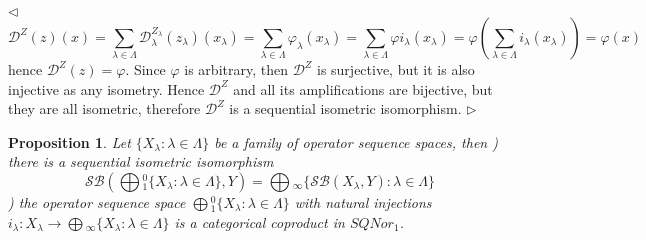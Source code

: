 \documentclass[12pt]{article}
\newtheorem{proposition}[theorem]{Proposition}
\newenvironment{proof}{\par $\triangleleft$}{$\triangleright$}
\begin{document}
\begin{proof}
$$
\mathcal{D}^{Z}(z)(x)
=\sum_{\lambda\in\Lambda}\mathcal{D}_\lambda^{Z_\lambda}(z_\lambda)(x_\lambda)
=\sum_{\lambda\in\Lambda}\varphi_\lambda(x_\lambda)
=\sum_{\lambda\in\Lambda}\varphi i_\lambda(x_\lambda)
=\varphi\left(\sum_{\lambda\in\Lambda} i_\lambda(x_\lambda)\right)
=\varphi(x)
$$
hence $\mathcal{D}^Z(z)=\varphi$. Since $\varphi$ is arbitrary, then $\mathcal{D}^Z$ is surjective, but it is also injective as any isometry. Hence $\mathcal{D}^Z$ and all its amplifications are bijective, but they are all isometric, therefore $\mathcal{D}^Z$ is a sequential isometric isomorphism.
\end{proof}

\begin{proposition}\label{PrSQCoProdUnivProp} Let $\{X_\lambda:\lambda\in \Lambda\}$ be a family of operator sequence spaces, then
) there is a sequential isometric isomorphism
$$
\mathcal{SB}\left(\bigoplus{}_1^0\{X_\lambda:\lambda\in\Lambda\},Y\right)
=\bigoplus{}_\infty\{\mathcal{SB}(X_\lambda,Y):\lambda\in\Lambda\}
$$
) the operator sequence space $\bigoplus{}_1^0\{X_\lambda:\lambda\in\Lambda\}$ with natural injections $i_\lambda:X_\lambda\to\bigoplus{}_\infty\{X_\lambda:\lambda\in\Lambda\}$ is a categorical coproduct in $SQNor_1$.
\end{proposition}
\end{document}
